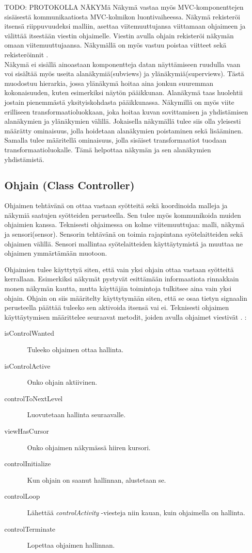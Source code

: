 \documentclass[finnish,utf8,nonumbib,palatino,kandi]{gradu2}
\begin{document}
TODO: PROTOKOLLA NÄKYMä
Näkymä vastaa myös MVC-komponenttejen sisäisestä kommunikaatiosta MVC-kolmikon luontivaiheessa. Näkymä rekisteröi itsensä  riippuvuudeksi malliin, asettaa viitemuuttujansa viittamaan ohjaimeen ja välittää itsestään viestin ohjaimelle. Viestin avulla ohjain rekisteröi näkymän omaan viitemuuttujaansa. Näkymällä on myös vastuu poistaa viitteet sekä rekisteröinnit \cite{Burbeck}. \\
Näkymä ei sisällä ainoastaan komponentteja datan näyttämiseen ruudulla vaan voi sisältää myös useita alanäkymiä(subviews) ja ylänäkymiä(superviews). Tästä muodostuu hierarkia, jossa ylänäkymä hoitaa aina jonkun suuremman kokonaisuuden, kuten esimerkiksi näytön pääikkunan. Alanäkymä taas huolehtii jostain pienemmästä yksityiskohdasta pääikkunassa. Näkymillä on myös viite erilliseen transformaatioluokkaan, joka hoitaa kuvan sovittamisen ja yhdistämisen alanäkymien ja ylänäkymien välillä. Jokaisella näkymällä tulee siis olla yleisesti määrätty ominaisuus, jolla hoidetaan alanäkymien poistaminen sekä lisääminen. Samalla tulee määritellä ominaisuus, jolla sisäiset transformaatiot tuodaan transformaatioluokalle. Tämä helpottaa näkymän ja sen alanäkymien yhdistämistä\cite[s. 8]{Krasner:desc}.

\subsection{Ohjain (Class Controller)}
Ohjaimen tehtävänä on ottaa vastaan syötteitä sekä koordinoida malleja ja näkymiä saatujen syötteiden perusteella. Sen tulee myös kommunikoida muiden ohjaimien kanssa. Teknisesti ohjaimessa on kolme viitemuuttujaa: malli, näkymä ja sensori(sensor). Sensorin tehtävänä on toimia rajapintana syötelaitteiden sekä ohjaimen välillä. Sensori mallintaa syötelaitteiden käyttäytymistä ja muuttaa ne ohjaimen ymmärtämään muotoon. 

Ohjaimien tulee käyttytyä siten, että vain yksi ohjain ottaa vastaan syötteitä kerrallaan. Esimerkiksi näkymät pystyvät esittämään informaatiota rinnakkain monen näkymän kautta, mutta käyttäjän toimintoja tulkitsee aina vain yksi ohjain. Ohjain on siis määritelty käyttytymään siten, että se osaa tietyn signaalin perusteella päättää tuleeko sen aktivoida itsensä vai ei. Teknisesti ohjaimen käyttäytymisen määrittelee seuraavat metodit, joiden avulla ohjaimet viestivät \cite{Krasner:desc}. : 
\begin{description}
\item[isControlWanted] \ Tuleeko ohjaimen ottaa hallinta.  
\item[isControlActive] \ Onko ohjain aktiivinen. 
\item[controlToNextLevel] \ Luovutetaan hallinta seuraavalle. 
\item[viewHasCursor] \ Onko ohjaimen näkymässä hiiren kursori. 
\item[controlInitialize] \ Kun ohjain on saanut hallinnan, alustetaan se. 
\item[controlLoop] \ Lähettää \emph{controlActivity} -viesteja niin kauan, kuin ohjaimella on hallinta. 
\item[controlTerminate] \ Lopettaa ohjaimen hallinnan.
\end{description}
\end{document}
